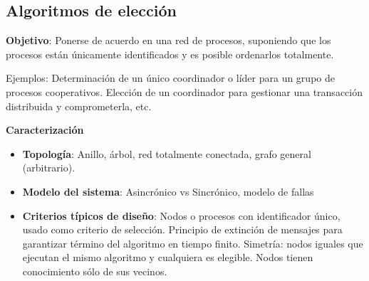 \subsection{Algoritmos de elección}
\textbf{Objetivo}: Ponerse de acuerdo en una red de procesos, suponiendo que los procesos están únicamente identificados y es posible ordenarlos totalmente.

Ejemplos: Determinación de un único coordinador o líder para un grupo de procesos cooperativos. Elección de un coordinador para gestionar una transacción distribuida y comprometerla, etc.

\vspace{0.5em}

\textbf{Caracterización} \begin{itemize}
    \item \textbf{Topología}: Anillo, árbol, red totalmente conectada, grafo general (arbitrario).
    \item \textbf{Modelo del sistema}: Asincrónico vs Sincrónico, modelo de fallas
    \item \textbf{Criterios típicos de diseño}: Nodos o procesos con identificador único, usado como criterio de selección. Principio de extinción de mensajes para garantizar término del algoritmo en tiempo finito. Simetría: nodos iguales que ejecutan el mismo algoritmo y cualquiera es elegible. Nodos tienen conocimiento sólo de sus vecinos.
\end{itemize}